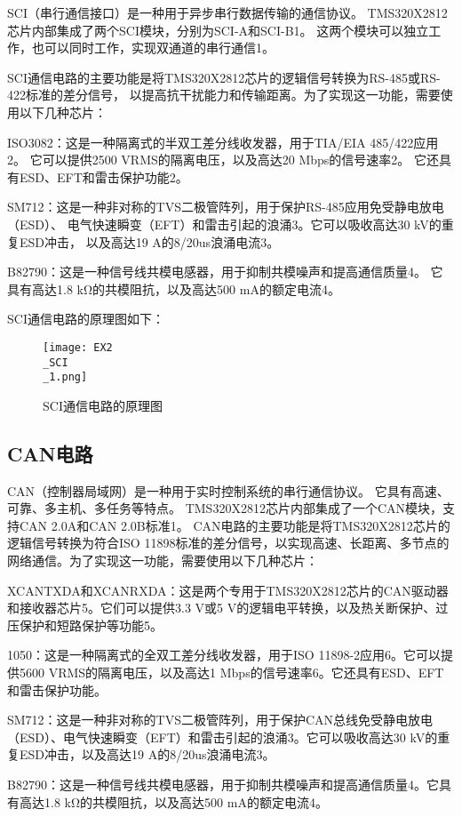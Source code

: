 \documentclass{math201}
\begin{document}
SCI（串行通信接口）是一种用于异步串行数据传输的通信协议。
TMS320X2812芯片内部集成了两个SCI模块，分别为SCI-A和SCI-B1。
这两个模块可以独立工作，也可以同时工作，实现双通道的串行通信1。

SCI通信电路的主要功能是将TMS320X2812芯片的逻辑信号转换为RS-485或RS-422标准的差分信号，
以提高抗干扰能力和传输距离。为了实现这一功能，需要使用以下几种芯片：

ISO3082：这是一种隔离式的半双工差分线收发器，用于TIA/EIA 485/422应用2。
它可以提供2500 VRMS的隔离电压，以及高达20 Mbps的信号速率2。
它还具有ESD、EFT和雷击保护功能2。

SM712：这是一种非对称的TVS二极管阵列，用于保护RS-485应用免受静电放电（ESD）、
电气快速瞬变（EFT）和雷击引起的浪涌3。它可以吸收高达30 kV的重复ESD冲击，
以及高达19 A的8/20us浪涌电流3。

B82790：这是一种信号线共模电感器，用于抑制共模噪声和提高通信质量4。
它具有高达1.8 kΩ的共模阻抗，以及高达500 mA的额定电流4。

SCI通信电路的原理图如下：

\begin{figure}[H]  
  \centering\texttt{[image: EX2\\\_SCI\\\_1.png]}  
  \caption{SCI通信电路的原理图}     
\end{figure}

\subsection{CAN电路}

CAN（控制器局域网）是一种用于实时控制系统的串行通信协议。
它具有高速、可靠、多主机、多任务等特点。
TMS320X2812芯片内部集成了一个CAN模块，支持CAN 2.0A和CAN 2.0B标准1。
CAN电路的主要功能是将TMS320X2812芯片的逻辑信号转换为符合ISO 11898标准的差分信号，以实现高速、长距离、多节点的网络通信。为了实现这一功能，需要使用以下几种芯片：

XCANTXDA和XCANRXDA：这是两个专用于TMS320X2812芯片的CAN驱动器和接收器芯片5。它们可以提供3.3 V或5 V的逻辑电平转换，以及热关断保护、过压保护和短路保护等功能5。

1050：这是一种隔离式的全双工差分线收发器，用于ISO 11898-2应用6。它可以提供5600 VRMS的隔离电压，以及高达1 Mbps的信号速率6。它还具有ESD、EFT和雷击保护功能。

SM712：这是一种非对称的TVS二极管阵列，用于保护CAN总线免受静电放电（ESD）、电气快速瞬变（EFT）和雷击引起的浪涌3。它可以吸收高达30 kV的重复ESD冲击，以及高达19 A的8/20us浪涌电流3。

B82790：这是一种信号线共模电感器，用于抑制共模噪声和提高通信质量4。它具有高达1.8 kΩ的共模阻抗，以及高达500 mA的额定电流4。
\end{document}
